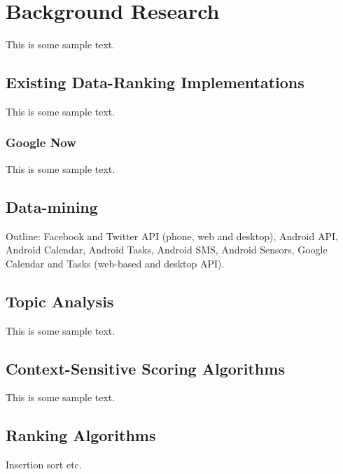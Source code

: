 \chapter{Background Research}

This is some sample text.

\section{Existing Data-Ranking Implementations}

This is some sample text.

\subsection{Google Now}

This is some sample text.

\section{Data-mining}

Outline: Facebook and Twitter API (phone, web and desktop), Android API, Android Calendar, Android Tasks, Android SMS, Android Sensors, Google Calendar and Tasks (web-based and desktop API).

\section{Topic Analysis}

This is some sample text.

\section{Context-Sensitive Scoring Algorithms}

This is some sample text.

\section{Ranking Algorithms}

Insertion sort etc.
